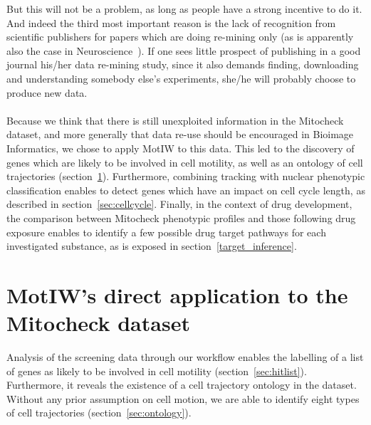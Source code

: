 But this will not be a problem, as long as people have a strong incentive to do it. And indeed the third most important reason is the lack of recognition from scientific publishers for papers which are doing re-mining only (as is apparently also the case in Neuroscience~\cite{pmid24904347}). If one sees little prospect of publishing in a good journal his/her data re-mining study, since it also demands finding, downloading and understanding somebody else's experiments, she/he will probably choose to produce new data.

\paragraph*{}Because we think that there is still unexploited information in the Mitocheck dataset, and more generally that data re-use should be encouraged in Bioimage Informatics, we chose to apply MotIW to this data. This led to the discovery of genes which are likely to be involved in cell motility, as well as an ontology of cell trajectories (section~\ref{sec:mitocheck}). Furthermore, combining tracking with nuclear phenotypic classification enables to detect genes which have an impact on cell cycle length, as described in section~\ref{sec:cellcycle}. Finally, in the context of drug development, the comparison between Mitocheck phenotypic profiles and those following drug exposure enables to identify a few possible drug target pathways for each investigated substance, as is exposed in section~\ref{target_inference}.

\section{MotIW's direct application to the Mitocheck dataset}
\label{sec:mitocheck}
 Analysis of the screening data through our workflow enables the labelling of a list of genes as likely to be involved in cell motility (section~\ref{sec:hitlist}). Furthermore, it reveals the existence of a cell trajectory ontology in the dataset. Without any prior assumption on cell motion, we are able to identify eight types of cell trajectories (section~\ref{sec:ontology}).

